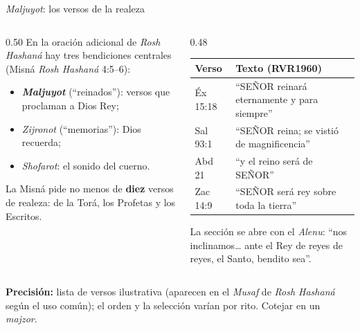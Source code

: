 \documentclass[hyperref={bookmarks=false},aspectratio=169]{beamer}
\newcommand{\SENOR}{S{\fontsize{0.78em}{1em}\selectfont EÑOR}}
\newcommand{\destacar}[1]{\textbf{\textcolor{azul}{#1}}}
\newcommand{\precision}[1]{{\footnotesize\color{gris}\textbf{Precisión:} #1}}
\begin{document}
\begin{frame}{\emph{Maljuyot}: los versos de la realeza}
\begin{columns}[t,onlytextwidth]
\begin{column}{0.50\textwidth}\small
En la oración adicional de \emph{Rosh Hashaná} hay tres bendiciones centrales (Misná \emph{Rosh Hashaná} 4:5--6):
\begin{itemize}
\item \destacar{\emph{Maljuyot}} (``reinados''): versos que proclaman a Dios Rey;
\item \emph{Zijronot} (``memorias''): Dios recuerda;
\item \emph{Shofarot}: el sonido del cuerno.
\end{itemize}
La Misná pide no menos de \destacar{diez} versos de realeza: de la Torá, los Profetas y los Escritos.
\end{column}
\begin{column}{0.48\textwidth}
\scriptsize\renewcommand{\arraystretch}{1.15}
\begin{tabular}{@{}>{\RaggedRight\arraybackslash}p{1.6cm}>{\RaggedRight\arraybackslash}p{4.0cm}@{}}
\toprule
\textbf{Verso} & \textbf{Texto (RVR1960)} \\ \midrule
Éx 15:18 & ``\SENOR{} reinará eternamente y para siempre'' \\
Sal 93:1 & ``\SENOR{} reina; se vistió de magnificencia'' \\
Abd 21 & ``y el reino será de \SENOR'' \\
Zac 14:9 & ``\SENOR{} será rey sobre toda la tierra'' \\
\bottomrule
\end{tabular}\par\smallskip
La sección se abre con el \emph{Alenu}: ``nos inclinamos\ldots{} ante el Rey de reyes de reyes, el Santo, bendito sea''.
\end{column}
\end{columns}\par\smallskip
\precision{lista de versos ilustrativa (aparecen en el \emph{Musaf} de \emph{Rosh Hashaná} según el uso común); el orden y la selección varían por rito. Cotejar en un \emph{majzor}.}
\end{frame}
\end{document}
